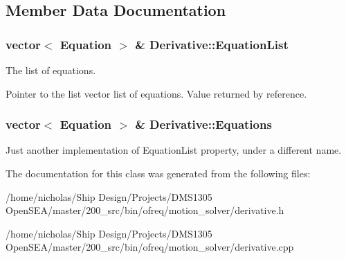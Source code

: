 \subsection{Member Data Documentation}
\hypertarget{class_derivative_aed6f05c911e91ef4690784072eeff9f1}{
\subsubsection[{Equation\-List}]{\setlength{\rightskip}{0pt plus 5cm}vector$<$ {\bf Equation} $>$ \& Derivative\-::\-Equation\-List}}\label{class_derivative_aed6f05c911e91ef4690784072eeff9f1}


The list of equations. 

Pointer to the list vector list of equations. Value returned by reference. \hypertarget{class_derivative_ade93a5b5e1f55b428b9e674f8ac02c9e}{
\subsubsection[{Equations}]{\setlength{\rightskip}{0pt plus 5cm}vector$<$ {\bf Equation} $>$ \& Derivative\-::\-Equations}}\label{class_derivative_ade93a5b5e1f55b428b9e674f8ac02c9e}
Just another implementation of Equation\-List property, under a different name. 

The documentation for this class was generated from the following files\-:\begin{DoxyCompactItemize}
\item 
/home/nicholas/\-Ship Design/\-Projects/\-D\-M\-S1305 Open\-S\-E\-A/master/200\-\_\-src/bin/ofreq/motion\-\_\-solver/derivative.\-h\item 
/home/nicholas/\-Ship Design/\-Projects/\-D\-M\-S1305 Open\-S\-E\-A/master/200\-\_\-src/bin/ofreq/motion\-\_\-solver/derivative.\-cpp\end{DoxyCompactItemize}
